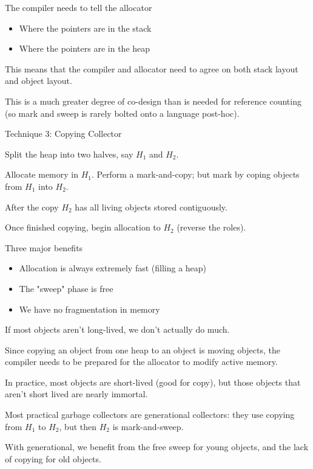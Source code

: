 \documentclass{article}
\begin{document}
The compiler needs to tell the allocator
\begin{itemize}
    \item Where the pointers are in the stack
    \item Where the pointers are in the heap
\end{itemize}

This means that the compiler and allocator need to agree on both stack
layout and object layout.

This is a much greater degree of co-design than is needed for reference
counting (so mark and sweep is rarely bolted onto a language post-hoc).

Technique 3: Copying Collector

Split the heap into two halves, say \(H_1\) and \(H_2\).

Allocate memory in \(H_1\). Perform a mark-and-copy; but mark by coping
objects from \(H_1\) into \(H_2\).

After the copy \(H_2\) has all living objects stored contiguously.

Once finished copying, begin allocation to \(H_2\) (reverse the roles).

Three major benefits

\begin{itemize}
    \item Allocation is always extremely fast (filling a heap)
    \item The "sweep" phase is free
    \item We have no fragmentation in memory
\end{itemize}

If most objects aren't long-lived, we don't actually do much.

Since copying an object from one heap to an object is moving objects,
the compiler needs to be prepared for the allocator to modify active
memory.

In practice, most objects are short-lived (good for copy), but those
objects that aren't short lived are nearly immortal.

Most practical garbage collectors are generational collectors: they use
copying from \(H_1\) to \(H_2\), but then \(H_2\) is mark-and-sweep.

With generational, we benefit from the free sweep for young objects, and
the lack of copying for old objects.
\end{document}
